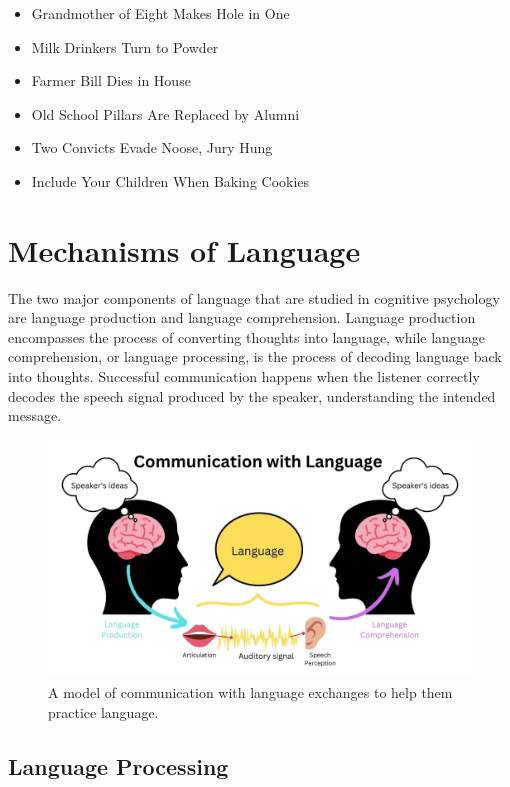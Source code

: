 \documentclass[
]{krantz}
\providecommand{\tightlist}{%
  \setlength{\itemsep}{0pt}\setlength{\parskip}{0pt}}
\begin{document}
\begin{itemize}
\tightlist
\item
  Grandmother of Eight Makes Hole in One
\item
  Milk Drinkers Turn to Powder
\item
  Farmer Bill Dies in House
\item
  Old School Pillars Are Replaced by Alumni
\item
  Two Convicts Evade Noose, Jury Hung
\item
  Include Your Children When Baking Cookies
\end{itemize}

\hypertarget{mechanisms-of-language}{%
\section{Mechanisms of Language}\label{mechanisms-of-language}}

The two major components of language that are studied in cognitive psychology are language production and language comprehension. Language production encompasses the process of converting thoughts into language, while language comprehension, or language processing, is the process of decoding language back into thoughts. Successful communication happens when the listener correctly decodes the speech signal produced by the speaker, understanding the intended message.

\begin{figure}

{\centering \includegraphics[width=0.8\linewidth]{images/ch8/model_of_language_draft} 

}

\caption{A model of communication with language exchanges to help them practice language.}\label{fig:model}
\end{figure}

\hypertarget{language-processing}{%
\subsection*{Language Processing}\label{language-processing}}
\end{document}

